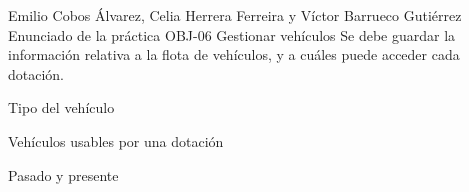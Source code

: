 {Emilio Cobos Álvarez, Celia Herrera Ferreira y Víctor Barrueco Gutiérrez}
{Enunciado de la práctica}
{OBJ-06 Gestionar vehículos}
{}
{Se debe guardar la información relativa a la flota de vehículos, y a cuáles puede acceder cada dotación.}
{
\item{Tipo del vehículo}
\item{Vehículos usables por una dotación}
}
{Pasado y presente}

